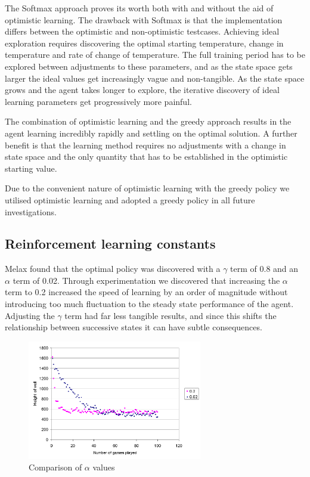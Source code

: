 \documentclass{rucsthesis}
\begin{document}
The Softmax approach proves its worth both with and without the aid of optimistic learning. The drawback with Softmax is that the implementation differs between the optimistic and non-optimistic testcases. Achieving ideal exploration requires discovering the optimal starting temperature, change in temperature and rate of change of temperature. The full training period has to be explored between adjustments to these parameters, and as the state space gets larger the ideal values get increasingly vague and non-tangible. As the state space grows and the agent takes longer to explore, the iterative discovery of ideal learning parameters get progressively more painful.

The combination of optimistic learning and the greedy approach results in the agent learning incredibly rapidly and settling on the optimal solution. A further benefit is that the learning method requires no adjustments with a change in state space and the only quantity that has to be established in the optimistic starting value.

Due to the convenient nature of optimistic learning with the greedy policy we utilised optimistic learning and adopted a greedy policy in all future investigations.

\subsection{Reinforcement learning constants}

Melax found that the optimal policy was discovered with a $\gamma$ term of 0.8 and an $\alpha$ term of 0.02. Through experimentation we discovered that increasing the $\alpha$ term to 0.2 increased the speed of learning by an order of magnitude without introducing too much fluctuation to the steady state performance of the agent. Adjusting the $\gamma$ term had far less tangible results, and since this shifts the relationship between successive states it can have subtle consequences.

\begin{figure}[h]
\centering
\includegraphics[width=3in]{alphacomp.png}
\caption{Comparison of $\alpha$ values}
\label{fig:alpha}
\end{figure} 
\end{document}
